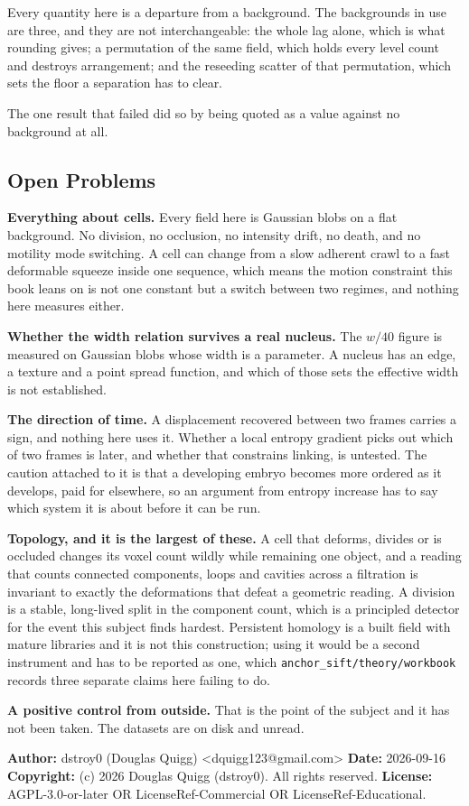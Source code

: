 Every quantity here is a departure from a background. The backgrounds in use are three, and they are
not interchangeable: the whole lag alone, which is what rounding gives; a permutation of the same
field, which holds every level count and destroys arrangement; and the reseeding scatter of that
permutation, which sets the floor a separation has to clear.

The one result that failed did so by being quoted as a value against no background at all.

\subsection{Open Problems}

\textbf{Everything about cells.} Every field here is Gaussian blobs on a flat background. No
division, no occlusion, no intensity drift, no death, and no motility mode switching. A cell can
change from a slow adherent crawl to a fast deformable squeeze inside one sequence, which means the
motion constraint this book leans on is not one constant but a switch between two regimes, and
nothing here measures either.

\textbf{Whether the width relation survives a real nucleus.} The $w/40$ figure is measured on
Gaussian blobs whose width is a parameter. A nucleus has an edge, a texture and a point spread
function, and which of those sets the effective width is not established.

\textbf{The direction of time.} A displacement recovered between two frames carries a sign, and
nothing here uses it. Whether a local entropy gradient picks out which of two frames is later, and
whether that constrains linking, is untested. The caution attached to it is that a developing embryo
becomes more ordered as it develops, paid for elsewhere, so an argument from entropy increase has to
say which system it is about before it can be run.

\textbf{Topology, and it is the largest of these.} A cell that deforms, divides or is occluded
changes its voxel count wildly while remaining one object, and a reading that counts connected
components, loops and cavities across a filtration is invariant to exactly the deformations that
defeat a geometric reading. A division is a stable, long-lived split in the component count, which
is a principled detector for the event this subject finds hardest. Persistent homology is a built
field with mature libraries and it is not this construction; using it would be a second instrument
and has to be reported as one, which
\texttt{anchor\_sift/\allowbreak{}theory/\allowbreak{}workbook} records three separate claims here
failing to do.

\textbf{A positive control from outside.} That is the point of the subject and it has not been
taken. The datasets are on disk and unread.

\medskip

\textbf{Author:} dstroy0 (Douglas Quigg) <dquigg123@gmail.com> \textbf{Date:} 2026-09-16
\textbf{Copyright:} (c) 2026 Douglas Quigg (dstroy0). All rights reserved.
\textbf{License:} AGPL-3.0-or-later OR LicenseRef-Commercial OR LicenseRef-Educational.
